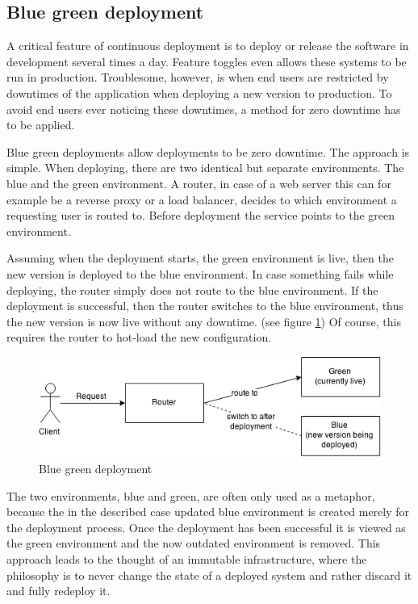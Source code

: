 \subsection{Blue green deployment}

A critical feature of continuous deployment is to deploy or release the
software in development several times a day. Feature toggles even allows
these systems to be run in production. Troublesome, however, is when end users
are restricted by downtimes of the application when deploying a new version to
production. To avoid end users ever noticing these downtimes, a method for zero
downtime has to be applied.

Blue green deployments allow deployments to be zero downtime. The approach is
simple. When deploying, there are two identical but separate environments. The
blue and the green environment. A router, in case of a web server this can for
example be a reverse proxy or a load balancer, decides to which environment a
requesting user is routed to. Before deployment the service points to the green
environment.

Assuming when the deployment starts, the green environment is live, then the
new version is deployed to the blue environment. In case something fails while
deploying, the router simply does not route to the blue environment. If the
deployment is successful, then the router switches to the blue environment,
thus the new version is now live without any downtime. (see figure
\ref{fig:blue_green_deployment}) Of course, this requires the router to hot-load the
new configuration.

\begin{figure}
  \includegraphics[scale=0.55]{pictures/blue_green_deployment.png}
  \caption{Blue green deployment}
  \centering
  \label{fig:blue_green_deployment}
\end{figure}

The two environments, blue and green, are often only used as a metaphor,
because the in the described case updated blue environment is created merely
for the deployment process. Once the deployment has been successful it is
viewed as the green environment and the now outdated environment is removed.
This approach leads to the thought of an immutable infrastructure, where the
philosophy is to never change the state of a deployed system and rather discard
it and fully redeploy it.

